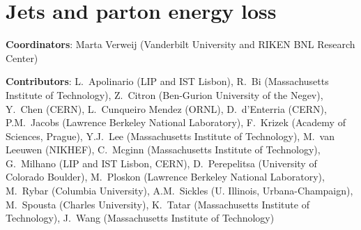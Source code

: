 \documentclass[../report.tex]{subfiles}
\providecommand{\main}{..}
\begin{document}
\section{Jets and parton energy loss}\label{sec:HI_Jets}

{ \small
  \noindent \textbf{Coordinators}: Marta Verweij (Vanderbilt University and RIKEN BNL Research Center)
  
  \noindent \textbf{Contributors}:
L.~Apolinario (LIP and IST Lisbon),
R.~Bi (Massachusetts Institute of Technology),
Z.~Citron (Ben-Gurion University of the Negev),
Y.~Chen (CERN),
L.~Cunqueiro Mendez (ORNL),
D.~d'Enterria (CERN),
P.M.~Jacobs (Lawrence Berkeley National Laboratory),
F.~Krizek (Academy of Sciences, Prague),
Y.J.~Lee (Massachusetts Institute of Technology),
M.~van Leeuwen (NIKHEF),
C.~Mcginn (Massachusetts Institute of Technology),
G.~Milhano (LIP and IST Lisbon, CERN),
D.~Perepelitsa (University of Colorado Boulder),
M.~Ploskon (Lawrence Berkeley National Laboratory),
M.~Rybar (Columbia University),
A.M.~Sickles (U. Illinois, Urbana-Champaign),
M.~Spousta (Charles University),
K.~Tatar (Massachusetts Institute of Technology),
J.~Wang (Massachusetts Institute of Technology)
}






%
\end{document}
